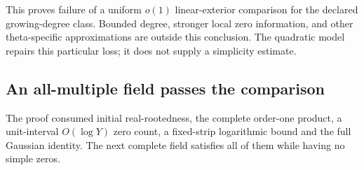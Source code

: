 This proves failure of a uniform $o(1)$ linear-exterior comparison
for the declared growing-degree class. Bounded degree, stronger local
zero information, and other theta-specific approximations are outside
this conclusion. The quadratic model repairs this particular loss;
it does not supply a simplicity estimate.

\subsection{An all-multiple field passes the comparison}
\label{na-control-subsection}
\label{subsec:na-controls}

The proof consumed initial real-rootedness, the complete order-one
product, a unit-interval $O(\log Y)$ zero count, a fixed-strip logarithmic
bound and the full Gaussian identity. The next complete field satisfies
all of them while having no simple zeros.

